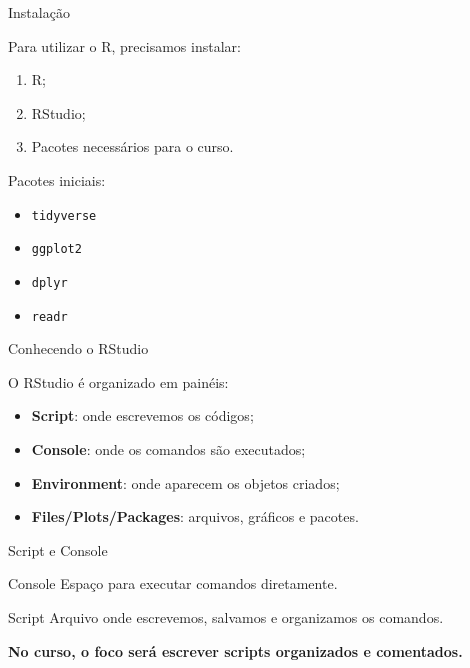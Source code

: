 \documentclass[11pt]{beamer}
\begin{document}
	\begin{frame}{Instalação}
		
		Para utilizar o R, precisamos instalar:
		
		\begin{enumerate}
			\item R;
			\item RStudio;
			\item Pacotes necessários para o curso.
		\end{enumerate}
		
		\vspace{0.4cm}
		
		Pacotes iniciais:
		
		\begin{itemize}
			\item \texttt{tidyverse}
			\item \texttt{ggplot2}
			\item \texttt{dplyr}
			\item \texttt{readr}
		\end{itemize}
		
	\end{frame}
	
	\begin{frame}{Conhecendo o RStudio}
		
		O RStudio é organizado em painéis:
		
		\begin{itemize}
			\item \textbf{Script}: onde escrevemos os códigos;
			\item \textbf{Console}: onde os comandos são executados;
			\item \textbf{Environment}: onde aparecem os objetos criados;
			\item \textbf{Files/Plots/Packages}: arquivos, gráficos e pacotes.
		\end{itemize}
		
	\end{frame}
	
	\begin{frame}{Script e Console}
		
		\begin{block}{Console}
			Espaço para executar comandos diretamente.
		\end{block}
		
		\begin{block}{Script}
			Arquivo onde escrevemos, salvamos e organizamos os comandos.
		\end{block}
		
		\vspace{0.3cm}
		
		\begin{center}
			\textbf{No curso, o foco será escrever scripts organizados e comentados.}
		\end{center}
		
	\end{frame}
	
\end{document}
